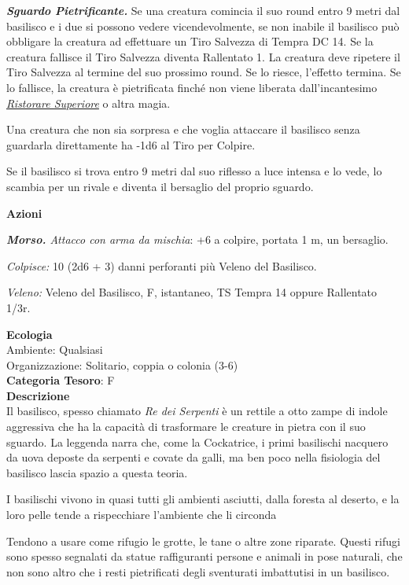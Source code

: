 \begin{multicols}{2}
{\emph{\textbf{Sguardo Pietrificante.}} Se una creatura comincia il suo round entro 9 metri dal basilisco e i due si possono vedere vicendevolmente, se non inabile il basilisco può obbligare la creatura ad effettuare un Tiro Salvezza di Tempra DC 14. Se la creatura fallisce il Tiro Salvezza diventa Rallentato 1. La creatura deve ripetere il Tiro Salvezza al termine del suo prossimo round. Se lo riesce, l'effetto termina. Se lo fallisce, la creatura è pietrificata finché non viene liberata dall'incantesimo \emph{\hyperlink{Ristorare Superiore}{Ristorare Superiore}} o altra magia.

Una creatura che non sia sorpresa e che voglia attaccare il basilisco senza guardarla direttamente ha -1d6 al Tiro per Colpire.

Se il basilisco si trova entro 9 metri dal suo riflesso a luce intensa e lo vede, lo scambia per un rivale e diventa il bersaglio del proprio sguardo.

\textbf{Azioni}

\emph{\textbf{Morso.} Attacco con arma da mischia}: +6 a colpire, portata 1 m, un bersaglio.

\emph{Colpisce:} 10 (2d6 + 3) danni perforanti più Veleno del Basilisco.

\emph{Veleno:} Veleno del Basilisco, F, istantaneo, TS Tempra 14 oppure Rallentato 1/3r.

\textbf{Ecologia}\\
Ambiente: Qualsiasi\\
Organizzazione: Solitario, coppia o colonia (3-6)\\
\textbf{Categoria Tesoro}: F\\
\textbf{Descrizione}\\
Il basilisco, spesso chiamato \emph{Re dei Serpenti} è un rettile a otto zampe di indole aggressiva che ha la capacità di trasformare le creature in pietra con il suo sguardo. La leggenda narra che, come la Cockatrice, i primi basilischi nacquero da uova deposte da serpenti e covate da galli, ma ben poco nella fisiologia del basilisco lascia spazio a questa teoria.

I basilischi vivono in quasi tutti gli ambienti asciutti, dalla foresta al deserto, e la loro pelle tende a rispecchiare l'ambiente che li circonda

Tendono a usare come rifugio le grotte, le tane o altre zone riparate. Questi rifugi sono spesso segnalati da statue raffiguranti persone e animali in pose naturali, che non sono altro che i resti pietrificati degli sventurati imbattutisi in un basilisco.

}
\end{multicols}
